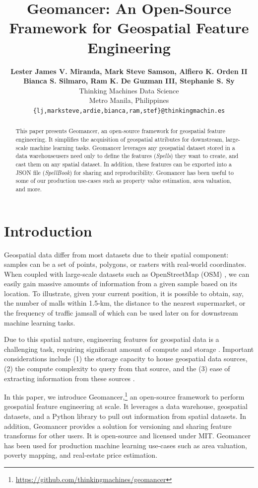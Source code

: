 \documentclass{article}
\title{Geomancer: An Open-Source Framework for Geospatial Feature Engineering}
\author{%
  \textbf{Lester James V. Miranda, Mark Steve Samson, Alfiero K. Orden II}\\
  \textbf{Bianca S. Silmaro, Ram K. De Guzman III, Stephanie S. Sy}\\
  Thinking Machines Data Science\\
  Metro Manila, Philippines\\
  \texttt{\{lj,marksteve,ardie,bianca,ram,stef\}@thinkingmachin.es} \\
}
\begin{document}
\maketitle

\begin{abstract}
    This paper presents Geomancer, an open-source framework for geospatial
    feature engineering. It simplifies the acquisition of geospatial attributes
    for downstream, large-scale machine learning tasks.  Geomancer leverages
    any geospatial dataset stored in a data warehouse\textemdash users need only to
    define the features (\textit{Spells}) they want to create, and cast them on
    any spatial dataset. In addition, these features can be exported into a
    JSON file (\textit{SpellBook}) for sharing and reproducibility.  Geomancer
    has been useful to some of our production use-cases such as property value
    estimation, area valuation, and more.
\end{abstract}

\section{Introduction}

Geospatial data differ from most datasets due to their spatial component:
samples can be a set of points, polygons, or rasters with real-world
coordinates. When coupled with large-scale datasets such as OpenStreetMap (OSM)
\cite{osm2017}, we can easily gain massive amounts of information from a given
sample based on its location. To illustrate, given your current position, it is
possible to obtain, say, the number of malls within 1.5-km, the distance to the
nearest supermarket, or the frequency of traffic jams\textemdash all of which
can be used later on for downstream machine learning tasks. 

Due to this spatial nature, engineering features for geospatial data is a
challenging task, requiring significant amount of compute and storage
\cite{nargesian2017learning, nargesian2018dataset, storcheus2015survey}.
Important considerations include (1) the storage capacity to house geospatial
data sources, (2) the compute complexity to query from that source, and the (3)
ease of extracting information from these sources \cite{klien2005requirements}. 

In this paper, we introduce
Geomancer,\footnote{\url{https://github.com/thinkingmachines/geomancer}} an
open-source framework to perform geospatial feature engineering at scale. It
leverages a data warehouse, geospatial datasets, and a Python library to pull
out information from spatial datasets. In addition, Geomancer provides a
solution for versioning and sharing feature transforms for other users. It is
open-source and licensed under MIT. Geomancer has been used for production
machine learning use-cases such as area valuation, poverty mapping, and
real-estate price estimation.
\end{document}
